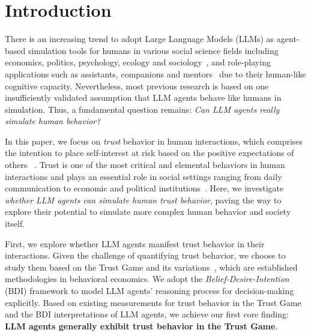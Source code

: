 \vspace{-0.4cm}
\section{Introduction}
\vspace{-0.1cm}

















There is an increasing trend to adopt Large Language Models (LLMs) as agent-based simulation tools for humans in various social science fields including economics, politics, psychology, ecology and sociology~\citep{gao2023large,manning2024automated,ziems2023can}, and role-playing applications such as assistants, companions and mentors~\citep{yang2024social,abdelghani2023gpt,chen2024persona} due to their human-like cognitive capacity. 
Nevertheless, most previous research is based on one insufficiently validated assumption that LLM agents behave like humans in simulation. Thus, a fundamental question remains: \textit{Can LLM agents really simulate human behavior?}






In this paper, we focus on \textit{trust} behavior in human interactions, 
which comprises the intention to place self-interest at risk based on the positive expectations of others
~\citep{rousseau1998not}. 
Trust is one of the most critical and elemental behaviors in human interactions and plays an essential role in social settings ranging from daily communication to economic and political institutions~\citep{uslanerProducingConsumingTrust2000,coleman1994foundations_risk}. 
Here, we investigate \textit{whether LLM agents can simulate human trust behavior}, paving the way to explore their potential to simulate more complex human behavior and society itself.


First, we explore whether LLM agents manifest trust behavior in their interactions. Given the challenge of quantifying trust behavior, we choose to study them based on the Trust Game and its variations~\citep{berg1995trust,Measuring_Trust}, which are established methodologies in behavioral economics. We adopt the \textit{Belief-Desire-Intention} (BDI) framework \citep{raoBDIAgentsTheory1995a,andreas-2022-language-BDI} to model LLM agents' reasoning process for decision-making explicitly. 
Based on existing measurements for trust behavior in the Trust Game
and the BDI interpretations of LLM agents, we achieve our first core finding: 
\textbf{LLM agents generally exhibit trust behavior in the Trust Game}.

